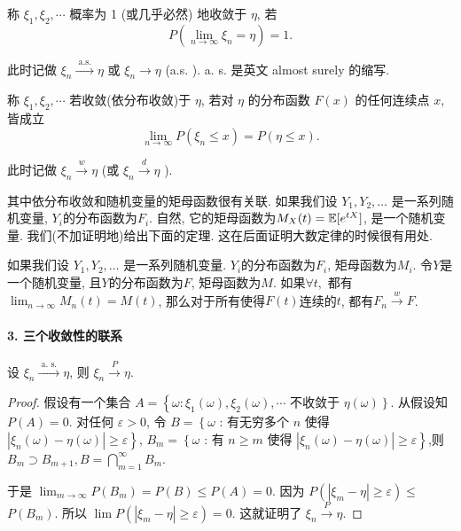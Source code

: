 \begin{definition}
    称 $\xi_1, \xi_2, \cdots$ 概率为 1 (或几乎必然) 地收敛于 $\eta$, 若
$$
P\left(\lim _{n \rightarrow \infty} \xi_n=\eta\right)=1 .
$$

此时记做 $\xi_n \stackrel{\text { a.s. }}{\longrightarrow} \eta$ 或 $\xi_n \rightarrow \eta$ (a.s. ). a. s. 是英文 almost surely 的缩写.
\end{definition}

\begin{definition}
    称 $\xi_1, \xi_2, \cdots$ 若收敛(依分布收敛)于 $\eta$, 若对 $\eta$ 的分布函数 $F(x)$ 的任何连续点 $x$, 皆成立
    $$
    \lim _{n \rightarrow \infty} P\left(\xi_n \leqslant x\right)=P(\eta \leqslant x) .
    $$
    
    此时记做 $\xi_n \stackrel{w}{\longrightarrow} \eta$ (或 $\xi_n \stackrel{d}{\longrightarrow} \eta$ ).
\end{definition}

其中依分布收敛和随机变量的矩母函数很有关联. 如果我们设 $Y_1, Y_2, \dots$ 是一系列随机变量, $Y_i$的分布函数为$F_i$. 自然, 它的矩母函数为$M_X(t)=\mathbb E[ e^{t X}]$, 是一个随机变量. 我们(不加证明地)给出下面的定理. 这在后面证明大数定律的时候很有用处. 

\begin{theorem}
    如果我们设 $Y_1, Y_2, \dots$ 是一系列随机变量. $Y_i$的分布函数为$F_i$, 矩母函数为$M_i$. 令$Y$是一个随机变量, 且$Y$的分布函数为$F$, 矩母函数为$M$. 如果$\forall t,$ 都有$\lim _{n \rightarrow \infty} M_n(t)=M(t)$, 那么对于所有使得$F(t)$连续的$t$, 都有$F_n \stackrel{w}{\longrightarrow} F$. 
\end{theorem}

\paragraph{3. 三个收敛性的联系}

\begin{theorem}
    设 $\xi_n \stackrel{\text { a. s. }}{\longrightarrow} \eta$, 则 $\xi_n \stackrel{P}{\longrightarrow} \eta$.
\end{theorem}

\begin{proof}
    假设有一个集合 $A=\left\{\omega: \xi_1(\omega), \xi_2(\omega), \cdots\right.$ 不收敛于 $\left.\eta(\omega)\right\}$. 从假设知 $P(A)=0$. 对任何 $\varepsilon>0$, 令
$B=\left\{\omega\right.$ : 有无穷多个 $n$ 使得 $\left.\left|\xi_n(\omega)-\eta(\omega)\right| \geqslant \varepsilon\right\}$,
$B_m=\left\{\omega\right.$ : 有 $n \geqslant m$ 使得 $\left.\left|\xi_n(\omega)-\eta(\omega)\right| \geqslant \varepsilon\right\}$,则 $B_m \supset B_{m+1}, B=\bigcap_{m=1}^{\infty} B_m$.

于是 $\lim _{m \rightarrow \infty} P\left(B_m\right)=P(B) \leqslant P(A)=0$. 因为 $P\left(\left|\xi_m-\eta\right| \geqslant \varepsilon\right) \leqslant$ $P\left(B_m\right)$. 所以 $\lim P\left(\left|\xi_m-\eta\right| \geqslant \varepsilon\right)=0$. 这就证明了 $\xi_n \stackrel{P}{\longrightarrow} \eta$.
\end{proof}

